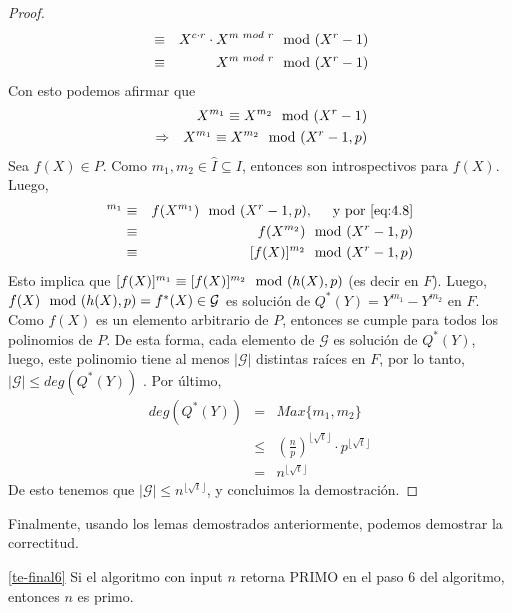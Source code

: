 \begin{proof}
\begin{eqnarray}
			&\equiv & X^{c\cdot r}\cdot X^{m\hspace{0.1cm}mod\hspace{0.1cm} r}  \mod (X^r-1) \nonumber\\
			&\equiv & X^{m\hspace{0.1cm}mod\hspace{0.1cm} r}\mod (X^r-1)\nonumber
		\end{eqnarray}
		Con esto podemos afirmar que 
		\begin{eqnarray}
			& & X^{m_1}\equiv X^{m_2} \mod (X^r-1)\nonumber\\
			&\Rightarrow & X^{m_1}\equiv X^{m_2} \mod (X^r-1,p)\label{eq:4.8}
		\end{eqnarray}
		Sea $f(X)\in P$. Como $m_1,m_2\in \hat{I}\subseteq I$, entonces son introspectivos para $f(X)$. Luego,
		\begin{eqnarray}
			[f(X)]^{m_1} &\equiv & f(X^{m_1}) \modulop,\hspace{0.5cm}\text{y por }\eqref{eq:4.8}\nonumber\\
			&\equiv & f(X^{m_2}) \modulop\nonumber\\
			&\equiv &[f(X)]^{m_2} \modulop\nonumber		
		\end{eqnarray}
		Esto implica que $[f(X)]^{m_1}\equiv [f(X)]^{m_2}\mod (h(X),p)$ (es decir en $F$). Luego, $f(X)\mod (h(X),p) = f^*(X)\in \mathcal{G}$ es solución de $Q^*(Y)= Y^{m_1}-Y^{m_2}$ en $F$. Como $f(X)$ es un elemento arbitrario de $P$, entonces se cumple para todos los polinomios de $P$. De esta forma, cada elemento de $\mathcal{G}$ es solución de $Q^*(Y)$, luego, este polinomio tiene al menos $|\mathcal{G}|$ distintas raí­ces en $F$, por lo tanto, $|\mathcal{G}|\leq deg(Q^*(Y))$ . Por último, 
		\begin{eqnarray}
			deg(Q^*(Y)) &=& Max\{m_1,m_2\}\nonumber\\
			&\leq& (\frac{n}{p})^{\lfloor \sqrt{t}\rfloor}\cdot p^{\lfloor \sqrt{t}\rfloor}\nonumber\\
			&=&n^{\lfloor \sqrt{t}\rfloor}\nonumber
		\end{eqnarray}
		De esto tenemos que $|\mathcal{G}|\leq n^{\lfloor \sqrt{t}\rfloor}$, y concluimos la demostración.
		
	\end{proof}
	Finalmente, usando los lemas demostrados anteriormente, podemos demostrar la correctitud.
	\begin{lemma}\ref{te-final6}
		Si el algoritmo con input $n$ retorna PRIMO en el paso 6 del algoritmo, entonces $n$ es primo.
	\end{lemma}
